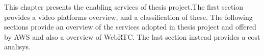 This chapter presents the enabling services of thesis project.The first section provides a video platforms overview, and a classification of these. The following sections  provide an overview of the services adopted in thesis project and offered by AWS and also a overview of WebRTC. The last section instead provides a cost analisys.